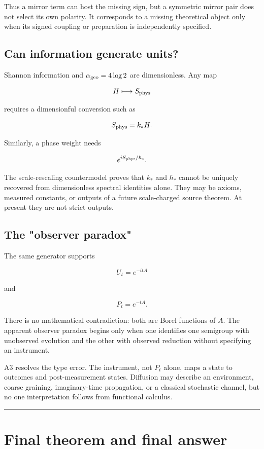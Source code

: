 \documentclass[11pt,a4paper,openany]{report}
\begin{document}
Thus a mirror term can host the missing sign, but a symmetric mirror pair does not select its own polarity. It corresponds to a missing theoretical object only when its signed coupling or preparation is independently specified.

\section{Can information generate units?}

Shannon information and \(\alpha_{\rm geo}=4\log2\) are dimensionless. Any map

\[
H\longmapsto S_{\rm phys}
\]

requires a dimensionful conversion such as

\[
S_{\rm phys}=k_*H.
\]

Similarly, a phase weight needs

\[
e^{iS_{\rm phys}/\hbar_*}.
\]

The scale-rescaling countermodel proves that \(k_*\) and \(\hbar_*\) cannot be uniquely recovered from dimensionless spectral identities alone. They may be axioms, measured constants, or outputs of a future scale-charged source theorem. At present they are not strict outputs.

\section{The "observer paradox"}

The same generator supports

\[
U_t=e^{-itA}
\]

and

\[
P_t=e^{-tA}.
\]

There is no mathematical contradiction: both are Borel functions of \(A\). The apparent observer paradox begins only when one identifies one semigroup with unobserved evolution and the other with observed reduction without specifying an instrument.

A3 resolves the type error. The instrument, not \(P_t\) alone, maps a state to outcomes and post-measurement states. Diffusion may describe an environment, coarse graining, imaginary-time propagation, or a classical stochastic channel, but no one interpretation follows from functional calculus.

\par\medskip\hrule\medskip

\chapter{Final theorem and final answer}
\end{document}
